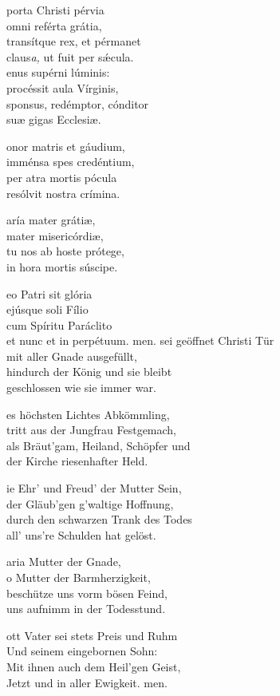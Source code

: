\documentclass[fontsize=10pt,paper=A5,twoside,BCOR=1mm,DIV=21,headinclude]{scrarticle}
\begin{document}
\begin{paracol}{2}\pcb
\begin{hymnus}
 porta Christi pérvia\\
\hspace{1.6em} omni reférta grátia,\\
transítque rex, et pérmanet\\
claus\textit{a,} ut fuit per s\'æcula.\\

enus supérni lúminis:\\
procéssit aula Vírginis,\\
sponsus, redémptor, cónditor\\
suæ gigas Ecclesiæ.

onor matris et gáudium,\\
imménsa spes credéntium,\\
per atra mortis pócula\\
resólvit nostra crímina.

aría mater grátiæ,\\
mater misericórdiæ,\\
tu nos ab hoste prótege,\\
in hora mortis súscipe.

eo Patri sit glória\\
ejúsque soli Fílio\\
cum Spíritu Paráclito\\
et nunc et in perpétuum. men.
	\switchcolumn
	 sei geöffnet Christi Tür\\
	\hspace{1.6em} mit aller Gnade ausgefüllt,\\
	hindurch der König und sie bleibt\\
	geschlossen wie sie immer war.

	es höchsten Lichtes Abkömmling,\\
	tritt aus der Jungfrau Festgemach,\\
	als Bräut'gam, Heiland, Schöpfer und\\
	der Kirche riesenhafter Held.

	ie Ehr' und Freud' der Mutter Sein,\\
	der Gläub'gen g'waltige Hoffnung,\\
	durch den schwarzen Trank des Todes\\
	all' uns're Schulden hat gelöst.

	aria Mutter der Gnade,\\
	o Mutter der Barmherzigkeit,\\
	beschütze uns vorm bösen Feind,\\
	uns aufnimm in der Todesstund.

	ott Vater sei stets Preis und Ruhm\\
	Und seinem eingebornen Sohn:\\
	Mit ihnen auch dem Heil'gen Geist,\\
	Jetzt und in aller Ewigkeit. men.
\end{hymnus}
\end{paracol}
\end{document}
